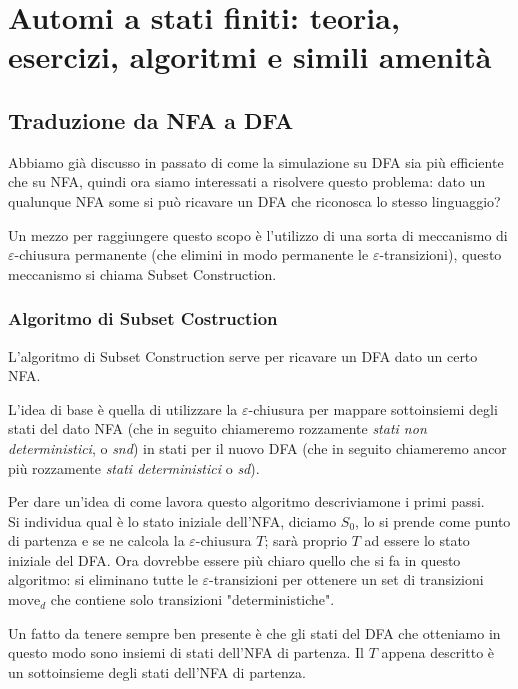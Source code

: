 \documentclass[class=book, crop=false, oneside, 12pt]{standalone}
\begin{document}
\chapter[Automi: teoria, esercizi, algoritmi e amenità]{Automi a stati finiti: teoria, esercizi, algoritmi e simili amenità}

\section{Traduzione da NFA a DFA}
Abbiamo già discusso in passato di come la simulazione su DFA sia più efficiente che su NFA, quindi ora siamo interessati a risolvere questo problema: dato un qualunque NFA some si può ricavare un DFA che riconosca lo stesso linguaggio?

Un mezzo per raggiungere questo scopo è l’utilizzo di una sorta di meccanismo di \(\varepsilon\)-chiusura permanente (che elimini in modo permanente le \(\varepsilon\)-transizioni), questo meccanismo si chiama Subset Construction.


\subsection{Algoritmo di Subset Costruction}
L’algoritmo di Subset Construction serve per ricavare un DFA dato un certo NFA.

L'idea di base è quella di utilizzare la \(\varepsilon\)-chiusura per mappare sottoinsiemi degli stati del dato NFA (che in seguito chiameremo rozzamente \emph{stati non deterministici}, o \emph{snd}) in stati per il nuovo DFA (che in seguito chiameremo ancor più rozzamente \emph{stati deterministici} o \emph{sd}).

Per dare un'idea di come lavora questo algoritmo descriviamone i primi passi.\\
Si individua qual è lo stato iniziale dell'NFA, diciamo \(S_0\), lo si prende come punto di partenza e se ne calcola la \(\varepsilon\)-chiusura \(T\); sarà proprio \(T\) ad essere lo stato iniziale del DFA. Ora dovrebbe essere più chiaro quello che si fa in questo algoritmo: si eliminano tutte le \(\varepsilon\)-transizioni per ottenere un set di transizioni \(\textrm{move}_d\) che contiene solo transizioni "deterministiche".

Un fatto da tenere sempre ben presente è che gli stati del DFA che otteniamo in questo modo sono insiemi di stati dell'NFA di partenza. Il \(T\) appena descritto è un sottoinsieme degli stati dell'NFA di partenza.
\end{document}
